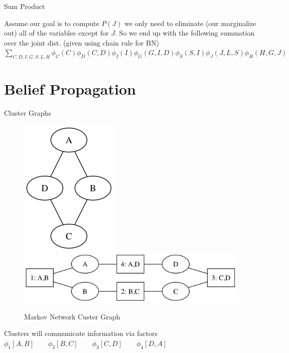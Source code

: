 \documentclass{beamer}
\begin{document}
\begin{darkframes}
\begin{frame}{Sum Product}
\begin{figure}
        \end{figure}

        Assume our goal is to compute \alert{$P(J)$} we only need to eliminate (our marginalize out) all of the variables
  except for \alert{$J$}. So we end up with the following summation over the joint dist. (given using chain rule for BN)        
        \qquad \\
        
            \alert{$ \sum\limits_{C,D,I,G,S,L,H} \phi_C(C) \phi_D(C,D) \phi_I(I) \phi_G(G,I,D) \phi_S(S,I) \phi_J(J,L,S) \phi_H(H,G,J)$}

    \end{frame}
    
    \section{Belief Propagation}
    \begin{frame}{Cluster Graphs}
        
        \begin{figure}
            \includegraphics[scale=0.3]{figures/simple_markov}
            \qquad 
            \qquad
            \qquad
            \includegraphics[scale=0.3]{figures/cluster_graph}
            \caption*{Markov Network \qquad \qquad \qquad \qquad \qquad Custer Graph}
        \end{figure}

    Clusters will communicate information via factors \alert{$\phi_1[A,B] \qquad \phi_2[B,C] \qquad \phi_3[C,D] \qquad \phi_4[D,A]$}


\end{frame}
\end{darkframes}
\end{document}
